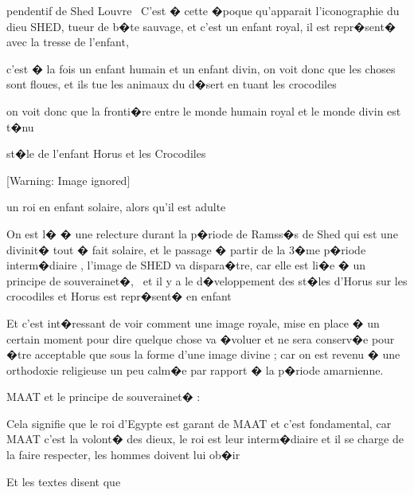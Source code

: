 \documentclass{article}
\begin{document}
pendentif de Shed Louvre \ C'est � cette �poque qu'apparait l'iconographie du dieu SHED, tueur de b�te sauvage, et c'est un enfant royal, il est repr�sent� avec la tresse de l'enfant, 

c'est � la fois un enfant humain et un enfant divin, on voit donc que les choses sont floues, et ils tue les animaux du d�sert en tuant les crocodiles

on voit donc que la fronti�re entre le monde humain royal et le monde divin est t�nu


\bigskip

st�le de l'enfant Horus et les Crocodiles


\bigskip

  [Warning: Image ignored] %
 


\bigskip


\bigskip


\bigskip

un roi en enfant solaire, alors qu'il est adulte

On est l� � une relecture durant la p�riode de Ramss�s de Shed qui est une divinit� tout � fait solaire, et le passage � partir de la 3�me p�riode interm�diaire , l'image de SHED va dispara�tre, car elle est li�e � un principe de souverainet�, \ et il y a le d�veloppement des st�les d'Horus sur les crocodiles et Horus est repr�sent� en enfant

Et c'est int�ressant de voir comment une image royale, mise en place � un certain moment pour dire quelque chose va �voluer et ne sera conserv�e pour �tre acceptable que sous la forme d'une image divine ; car on est revenu � une orthodoxie religieuse un peu calm�e par rapport � la p�riode amarnienne.


\bigskip


\bigskip


\bigskip


\bigskip

MAAT et le principe de souverainet� :


\bigskip

Cela signifie que le roi d'Egypte est garant de MAAT et c'est fondamental, car MAAT c'est la volont� des dieux, le roi est leur interm�diaire et il se charge de la faire respecter, les hommes doivent lui ob�ir

Et les textes disent que 
\end{document}
